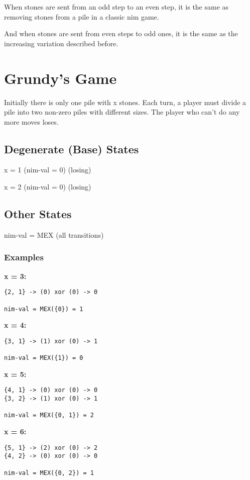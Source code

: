When stones are sent from an odd step to an even step, it is the same as removing stones from a pile in a classic nim game.

And when stones are sent from even steps to odd ones, it is the same as the increasing variation described before.

\section{Grundy's Game}

Initially there is only one pile with x stones.
Each turn, a player must divide a pile into two non-zero piles with different sizes.
The player who can't do any more moves loses.

\subsection{Degenerate (Base) States}

x = 1 (nim-val = 0) (losing)

x = 2 (nim-val = 0) (losing)

\subsection{Other States}

nim-val = MEX (all transitions)

\subsubsection{Examples}

\textbf{x = 3:}
\begin{lstlisting}
{2, 1} -> (0) xor (0) -> 0

nim-val = MEX({0}) = 1
\end{lstlisting}

\textbf{x = 4:}
\begin{lstlisting}
{3, 1} -> (1) xor (0) -> 1

nim-val = MEX({1}) = 0
\end{lstlisting}

\textbf{x = 5:}
\begin{lstlisting}
{4, 1} -> (0) xor (0) -> 0
{3, 2} -> (1) xor (0) -> 1

nim-val = MEX({0, 1}) = 2
\end{lstlisting}

\textbf{x = 6:}
\begin{lstlisting}
{5, 1} -> (2) xor (0) -> 2
{4, 2} -> (0) xor (0) -> 0
    
nim-val = MEX({0, 2}) = 1
\end{lstlisting}

